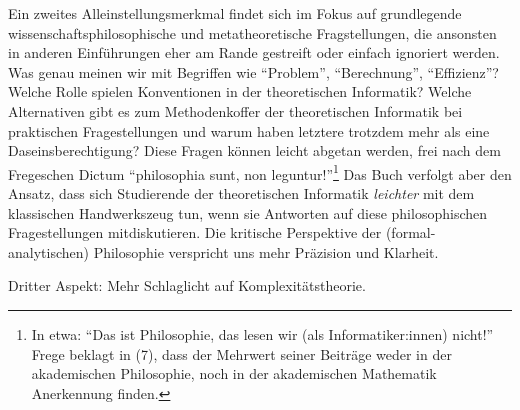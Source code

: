 Ein zweites Alleinstellungsmerkmal findet sich im Fokus auf grundlegende
wissenschaftsphilosophische und metatheoretische Fragstellungen,
die ansonsten in anderen Einführungen eher am Rande gestreift
oder einfach ignoriert werden.
Was genau meinen wir mit Begriffen wie ``Problem'', ``Berechnung'', ``Effizienz''?
Welche Rolle spielen Konventionen in der theoretischen Informatik?
Welche Alternativen gibt es zum Methodenkoffer der theoretischen Informatik
bei praktischen Fragestellungen
und warum haben letztere trotzdem mehr als eine Daseinsberechtigung?
Diese Fragen können leicht abgetan werden, frei nach dem Fregeschen Dictum
``philosophia sunt, non leguntur!''\footnote{
    In etwa: ``Das ist Philosophie,
    das lesen wir (als Informatiker:innen) nicht!''
    Frege beklagt in \cite{frege_grundgesetze} (7),
    dass der Mehrwert seiner Beiträge weder in der akademischen Philosophie,
    noch in der akademischen Mathematik Anerkennung finden.
}
Das Buch verfolgt aber den Ansatz,
dass sich Studierende der theoretischen Informatik
\emph {leichter} mit dem klassischen Handwerkszeug tun,
wenn sie Antworten auf diese philosophischen Fragestellungen mitdiskutieren.
Die kritische Perspektive der (formal-analytischen) Philosophie
verspricht uns mehr Präzision und Klarheit.

Dritter Aspekt: Mehr Schlaglicht auf Komplexitätstheorie.

